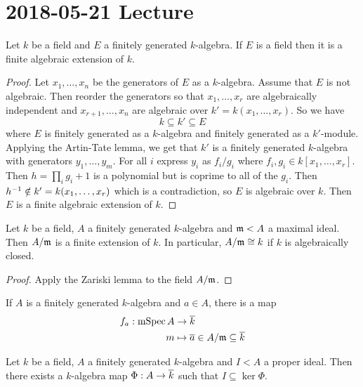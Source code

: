 \section{2018-05-21 Lecture}

\begin{thm}
  Let $k$ be a field and $E$ a finitely generated $k$-algebra.
  If $E$ is a field then it is a finite algebraic extension of $k$.
\end{thm}

\begin{proof}
  Let $x_1,\ldots,x_n$ be the generators of $E$ as a $k$-algebra.
  Assume that $E$ is not algebraic.
  Then reorder the generators so that $x_1,\ldots,x_r$ are algebraically independent and $x_{r+1},\ldots,x_n$ are algebraic over $k'=k(x_1,\ldots,x_r)$.
  So we have
  \[ k \subseteq k' \subseteq E \]
  where $E$ is finitely generated as a $k$-algebra and finitely generated as a $k'$-module.
  Applying the Artin-Tate lemma, we get that $k'$ is a finitely generated $k$-algebra with generators $y_1,\ldots,y_m$.
  For all $i$ express $y_i$ as $f_i/g_i$ where $f_i,g_i \in k[x_1,\ldots,x_r]$.
  Then $h = \prod_i g_i + 1$ is a polynomial but is coprime to all of the $g_i$.
  Then $h^{-1} \notin k'=k(x_1,\ldots,x_r)$ which is a contradiction, so $E$ is algebraic over $k$.
  Then $E$ is a finite algebraic extension of $k$.
\end{proof}

\begin{thm}
  Let $k$ be a field, $A$ a finitely generated $k$-algebra and $\mathfrak{m}<A$ a maximal ideal.
  Then $A/\mathfrak{m}$ is a finite extension of $k$.
  In particular, $A/\mathfrak{m} \cong k$ if $k$ is algebraically closed.
\end{thm}

\begin{proof}
  Apply the Zariski lemma to the field $A/\mathfrak{m}$.
\end{proof}

\begin{rmk}
  If $A$ is a finitely generated $k$-algebra and $a \in A$, there is a map
  \begin{align*}
    f_a: \operatorname{mSpec} A &\to \overline k \\
    m &\mapsto \overline a \in A/\mathfrak{m} \subseteq \overline k
  \end{align*}
\end{rmk}

\begin{cor}[3.25]
  Let $k$ be a field, $A$ a finitely generated $k$-algebra and $I<A$ a proper ideal.
  Then there exists a $k$-algebra map $\Phi: A \to \overline k$ such that $I \subseteq \ker \Phi$.
\end{cor}

